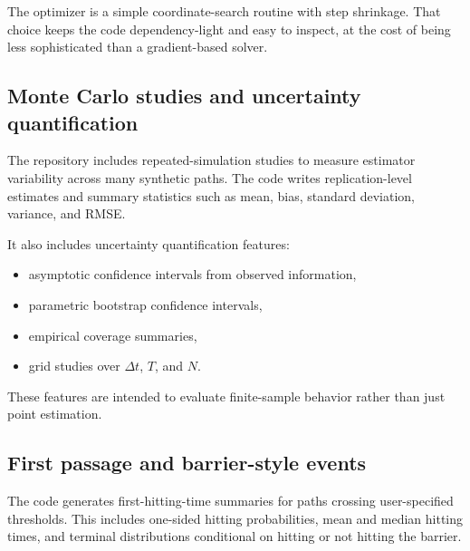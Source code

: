 \documentclass[11pt]{article}
\begin{document}
The optimizer is a simple coordinate-search routine with step shrinkage. That choice keeps the code dependency-light and easy to inspect, at the cost of being less sophisticated than a gradient-based solver.

\subsection{Monte Carlo studies and uncertainty quantification}

The repository includes repeated-simulation studies to measure estimator variability across many synthetic paths. The code writes replication-level estimates and summary statistics such as mean, bias, standard deviation, variance, and RMSE.

It also includes uncertainty quantification features:
\begin{itemize}[leftmargin=1.2em]
  \item asymptotic confidence intervals from observed information,
  \item parametric bootstrap confidence intervals,
  \item empirical coverage summaries,
  \item grid studies over $\Delta t$, $T$, and $N$.
\end{itemize}

These features are intended to evaluate finite-sample behavior rather than just point estimation.

\subsection{First passage and barrier-style events}

The code generates first-hitting-time summaries for paths crossing user-specified thresholds. This includes one-sided hitting probabilities, mean and median hitting times, and terminal distributions conditional on hitting or not hitting the barrier.
\end{document}
